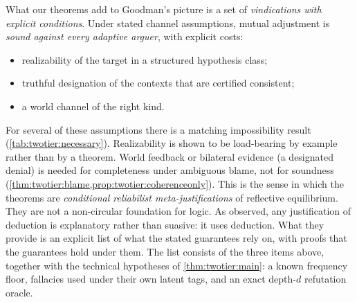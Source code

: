 What our theorems add to Goodman's picture is a set of \emph{vindications with explicit conditions}. Under stated channel assumptions, mutual adjustment is \emph{sound against every adaptive arguer}, with explicit costs:
\begin{itemize}
\item realizability of the target in a structured hypothesis class;
\item truthful designation of the contexts that are certified consistent;
\item a world channel of the right kind.
\end{itemize}
For several of these assumptions there is a matching impossibility result (\cref{tab:twotier:necessary}). Realizability is shown to be load-bearing by example rather than by a theorem. World feedback or bilateral evidence (a designated denial) is needed for completeness under ambiguous blame, not for soundness (\cref{thm:twotier:blame,prop:twotier:coherenceonly}). This is the sense in which the theorems are \emph{conditional reliabilist meta-justifications} of reflective equilibrium. They are not a non-circular foundation for logic. As \citet{dummett1973justification} observed, any justification of deduction is explanatory rather than suasive: it uses deduction. What they provide is an explicit list of what the stated guarantees rely on, with proofs that the guarantees hold under them. The list consists of the three items above, together with the technical hypotheses of \cref{thm:twotier:main}: a known frequency floor, fallacies used under their own latent tags, and an exact depth-$d$ refutation oracle.

